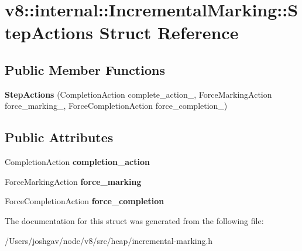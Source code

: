 \hypertarget{structv8_1_1internal_1_1_incremental_marking_1_1_step_actions}{}\section{v8\+:\+:internal\+:\+:Incremental\+Marking\+:\+:Step\+Actions Struct Reference}
\label{structv8_1_1internal_1_1_incremental_marking_1_1_step_actions}
\subsection*{Public Member Functions}
\begin{DoxyCompactItemize}
\item 
{\bfseries Step\+Actions} (Completion\+Action complete\+\_\+action\+\_\+, Force\+Marking\+Action force\+\_\+marking\+\_\+, Force\+Completion\+Action force\+\_\+completion\+\_\+)\hypertarget{structv8_1_1internal_1_1_incremental_marking_1_1_step_actions_ae7fe0e92675cd1254cd0966a67c10c4b}{}\label{structv8_1_1internal_1_1_incremental_marking_1_1_step_actions_ae7fe0e92675cd1254cd0966a67c10c4b}

\end{DoxyCompactItemize}
\subsection*{Public Attributes}
\begin{DoxyCompactItemize}
\item 
Completion\+Action {\bfseries completion\+\_\+action}\hypertarget{structv8_1_1internal_1_1_incremental_marking_1_1_step_actions_af4f3df2e5b520186d6763f148d5a6a65}{}\label{structv8_1_1internal_1_1_incremental_marking_1_1_step_actions_af4f3df2e5b520186d6763f148d5a6a65}

\item 
Force\+Marking\+Action {\bfseries force\+\_\+marking}\hypertarget{structv8_1_1internal_1_1_incremental_marking_1_1_step_actions_ad68163874113af62592a685b5563e1f0}{}\label{structv8_1_1internal_1_1_incremental_marking_1_1_step_actions_ad68163874113af62592a685b5563e1f0}

\item 
Force\+Completion\+Action {\bfseries force\+\_\+completion}\hypertarget{structv8_1_1internal_1_1_incremental_marking_1_1_step_actions_a45d994d07052a7828a9ac46780a1247e}{}\label{structv8_1_1internal_1_1_incremental_marking_1_1_step_actions_a45d994d07052a7828a9ac46780a1247e}

\end{DoxyCompactItemize}


The documentation for this struct was generated from the following file\+:\begin{DoxyCompactItemize}
\item 
/\+Users/joshgav/node/v8/src/heap/incremental-\/marking.\+h\end{DoxyCompactItemize}
